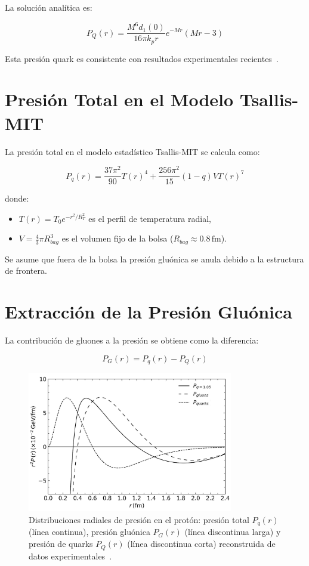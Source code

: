 La soluci\'on anal\'itica es:

\begin{equation}
P_Q(r) = \frac{M^6 d_1(0)}{16\pi k_p r} e^{-M r}(M r - 3)
\end{equation}

Esta presi\'on quark es consistente con resultados experimentales recientes~\cite{Burkert_2018}.

\section{Presi\'on Total en el Modelo Tsallis-MIT}
La presi\'on total en el modelo estad\'istico Tsallis-MIT se calcula como:

\begin{equation}
P_q(r) = \frac{37\pi^2}{90} T(r)^4 + \frac{256\pi^2}{15}(1-q) V T(r)^7
\end{equation}

donde:
\begin{itemize}
\item $T(r) = T_0 e^{-r^2/R_T^2}$ es el perfil de temperatura radial,
\item $V = \frac{4}{3}\pi R_{bag}^3$ es el volumen fijo de la bolsa (\( R_{bag} \approx 0.8\,\mathrm{fm} \)).
\end{itemize}

Se asume que fuera de la bolsa la presi\'on glu\'onica se anula debido a la estructura de frontera.

\section{Extracci\'on de la Presi\'on Glu\'onica}
La contribuci\'on de gluones a la presi\'on se obtiene como la diferencia:

\begin{equation}
P_G(r) = P_q(r) - P_Q(r)
\end{equation}

\begin{figure}[h]
    \centering
    \includegraphics[width=0.8\textwidth]{./Images/PressureDistributionsTot-Q-G.png}
    \caption{Distribuciones radiales de presi\'on en el prot\'on: presi\'on total $P_q(r)$ (l\'inea continua), presi\'on glu\'onica $P_G(r)$ (l\'inea discontinua larga) y presi\'on de quarks $P_Q(r)$ (l\'inea discontinua corta) reconstruida de datos experimentales~\cite{Burkert_2018}.}
    \label{fig:PressureDecomp}
\end{figure}

